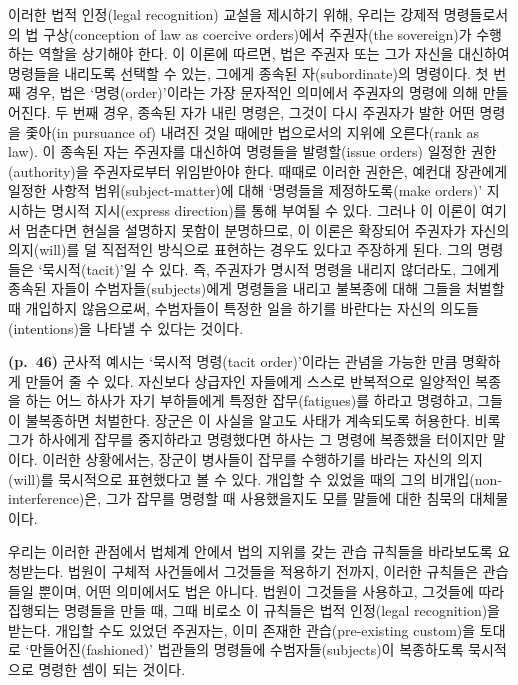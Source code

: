 이러한 법적 인정(legal recognition) 교설을 제시하기 위해, 우리는 강제적
명령들로서의 법 구상(conception of law as coercive orders)에서
주권자(the sovereign)가 수행하는 역할을 상기해야 한다. 이 이론에 따르면,
법은 주권자 또는 그가 자신을 대신하여 명령들을 내리도록 선택할 수 있는,
그에게 종속된 자(subordinate)의 명령이다. 첫 번째 경우, 법은
‘명령(order)’이라는 가장 문자적인 의미에서 주권자의 명령에 의해
만들어진다. 두 번째 경우, 종속된 자가 내린 명령은, 그것이 다시 주권자가
발한 어떤 명령을 좇아(in pursuance of) 내려진 것일 때에만 법으로서의
지위에 오른다(rank as law). 이 종속된 자는 주권자를 대신하여 명령들을
발령할(issue orders) 일정한 권한(authority)을 주권자로부터 위임받아야
한다. 때때로 이러한 권한은, 예컨대 장관에게 일정한 사항적
범위(subject-matter)에 대해 ‘명령들을 제정하도록(make orders)’ 지시하는
명시적 지시(express direction)를 통해 부여될 수 있다. 그러나 이 이론이
여기서 멈춘다면 현실을 설명하지 못함이 분명하므로, 이 이론은 확장되어
주권자가 자신의 의지(will)를 덜 직접적인 방식으로 표현하는 경우도 있다고
주장하게 된다. 그의 명령들은 ‘묵시적(tacit)’일 수 있다. 즉, 주권자가
명시적 명령을 내리지 않더라도, 그에게 종속된 자들이
수범자들(subjects)에게 명령들을 내리고 불복종에 대해 그들을 처벌할 때
개입하지 않음으로써, 수범자들이 특정한 일을 하기를 바란다는 자신의
의도들(intentions)을 나타낼 수 있다는 것이다.

\textbf{(p.~46)} 군사적 예시는 ‘묵시적 명령(tacit order)’이라는 관념을
가능한 만큼 명확하게 만들어 줄 수 있다. 자신보다 상급자인 자들에게
스스로 반복적으로 일양적인 복종을 하는 어느 하사가 자기 부하들에게
특정한 잡무(fatigues)를 하라고 명령하고, 그들이 불복종하면 처벌한다.
장군은 이 사실을 알고도 사태가 계속되도록 허용한다. 비록 그가 하사에게
잡무를 중지하라고 명령했다면 하사는 그 명령에 복종했을 터이지만 말이다.
이러한 상황에서는, 장군이 병사들이 잡무를 수행하기를 바라는 자신의
의지(will)를 묵시적으로 표현했다고 볼 수 있다. 개입할 수 있었을 때의
그의 비개입(non-interference)은, 그가 잡무를 명령할 때 사용했을지도 모를
말들에 대한 침묵의 대체물이다.

우리는 이러한 관점에서 법체계 안에서 법의 지위를 갖는 관습 규칙들을
바라보도록 요청받는다. 법원이 구체적 사건들에서 그것들을 적용하기
전까지, 이러한 규칙들은  관습들일 뿐이며, 어떤
의미에서도 법은 아니다. 법원이 그것들을 사용하고, 그것들에 따라 집행되는
명령들을 만들 때, 그때 비로소 이 규칙들은 법적 인정(legal recognition)을
받는다. 개입할 수도 있었던 주권자는, 이미 존재한 관습(pre-existing
custom)을 토대로 ‘만들어진(fashioned)’ 법관들의 명령들에
수범자들(subjects)이 복종하도록 묵시적으로 명령한 셈이 되는 것이다.


